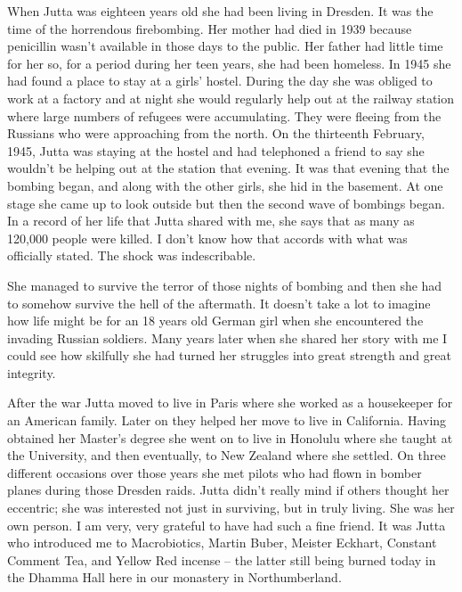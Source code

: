 When Jutta was eighteen years old she had been living in Dresden. It was the
time of the horrendous firebombing\cite{firebombing}.
Her mother had died in 1939 because penicillin wasn't
available in those days to the public. Her father had little time for
her so, for a period during her teen years, she had been homeless. In
1945 she had found a place to stay at a girls' hostel. During the day
she was obliged to work at a factory and at night she would regularly
help out at the railway station where large numbers of refugees were
accumulating. They were fleeing from the Russians who were approaching
from the north. On the thirteenth February, 1945, Jutta was staying at
the hostel and had telephoned a friend to say she wouldn't be helping
out at the station that evening. It was that evening that the bombing
began, and along with the other girls, she hid in the basement. At one
stage she came up to look outside but then the second wave of bombings
began. In a record of her life that Jutta shared with me, she says that
as many as 120,000 people were killed. I don't know how that accords
with what was officially stated. The shock was indescribable.

She managed to survive the terror of those nights of bombing and then
she had to somehow survive the hell of the aftermath. It doesn't take a
lot to imagine how life might be for an 18 years old German girl when
she encountered the invading Russian soldiers. Many years later when she
shared her story with me I could see how skilfully she had turned her
struggles into great strength and great integrity.

After the war Jutta moved to live in Paris where she worked as a
housekeeper for an American family. Later on they helped her move to
live in California. Having obtained her Master's degree she went on to
live in Honolulu where she taught at the University, and then
eventually, to New Zealand where she settled. On three different
occasions over those years she met pilots who had flown in bomber planes
during those Dresden raids. Jutta didn't really mind if others thought
her eccentric; she was interested not just in surviving, but in truly
living. She was her own person. I am very, very grateful to have had
such a fine friend. It was Jutta who introduced me to Macrobiotics,
Martin Buber, Meister Eckhart, Constant Comment Tea, and Yellow Red
incense -- the latter still being burned today in the Dhamma Hall here
in our monastery in Northumberland.

